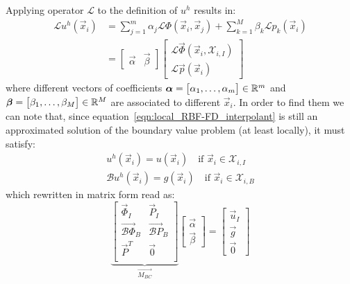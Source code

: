 \medskip
Applying operator $\mathcal{L}$ to the definition of $u^h$ results in:
\begin{equation}
	\label{eqn:L_of_local_RBF-FD_interpolant}
	\begin{aligned}
		\mathcal{L} u^h(\vec{x}_i) & = \sum_{j=1}^{m} \alpha_j \mathcal{L} \Phi(\vec{x}_i, \vec{x}_j) + \sum_{k=1}^{M} \beta_k \mathcal{L} p_k(\vec{x}_i)  \\
								   & = \begin{bmatrix}
								   			\vec{\alpha} & \vec{\beta}
								   	   \end{bmatrix}
							   	   	   \begin{bmatrix}
							   	   	   		\mathcal{L} \vec{\Phi}(\vec{x}_i, \mathcal{X}_{i,I})  \\
							   	   	   		\mathcal{L} \vec{p}(\vec{x}_i)
							   	   	   \end{bmatrix}	
	\end{aligned}
\end{equation}
where different vectors of coefficients $\boldsymbol{\alpha} = \bigl[\alpha_1, \dots, \alpha_m \bigr] \in \mathbb{R}^m$ and $\boldsymbol{\beta} = \bigl[ \beta_1, \dots, \beta_M \bigr] \in \mathbb{R}^M$ are associated to different $\vec{x}_i$.
In order to find them we can note that, since equation~\eqref{eqn:local_RBF-FD_interpolant} is still an approximated solution of the boundary value problem (at least locally), it must satisfy:
\begin{subequations}
\label{eqn:interpolation_conditions_on_PDE}
	\begin{gather}
		u^h(\vec{x}_i) = u(\vec{x}_i) \quad \text{if $\vec{x}_i \in \mathcal{X}_{i,I}$}  \label{eqn:u^h_approx_u_conditions} \\
		\mathcal{B} u^h(\vec{x}_i) = g(\vec{x}_i) \quad \text{if $\vec{x}_i \in \mathcal{X}_{i,B}$} \label{eqn:u^h_approx_conditions_on_boundary}
	\end{gather}
\end{subequations}
which rewritten in matrix form read as:
\begin{equation}
\label{eqn:interpolation_system_of_RBF-FD}
\underbrace{
\begin{bmatrix}
	\vec{\Phi}_I  			 &  \vec{P}_I  			  \\
	\vec{\mathcal{B}\Phi}_B  &  \vec{\mathcal{B}P}_B  \\
	\vec{P}^T				 &  \vec{0}				  \\
\end{bmatrix}}_{\vec{M_{BC}}}
\begin{bmatrix}
	\vec{\alpha}  \\
	\vec{\beta}
\end{bmatrix}
=
\begin{bmatrix}
	\vec{u}_I  \\
	\vec{g}	   \\
	\vec{0}
\end{bmatrix}
\end{equation}

